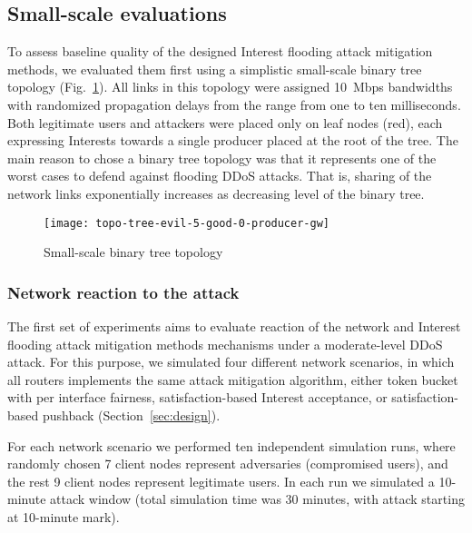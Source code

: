 \subsection{Small-scale evaluations}
\label{sec:small-scale}

To assess baseline quality of the designed Interest flooding attack mitigation methods, we evaluated them first using a simplistic small-scale binary tree topology (Fig.~\ref{fig:small-scale}).
All links in this topology were assigned 10~Mbps bandwidths with randomized propagation delays from the range from one to ten milliseconds.
Both legitimate users and attackers were placed only on leaf nodes (red), each expressing Interests towards a single producer placed at the root of the tree. 
The main reason to chose a binary tree topology was that it represents one of the worst cases to defend against flooding DDoS attacks.
That is, sharing of the network links exponentially increases as decreasing level of the binary tree.

\begin{figure}[htbp]
  \centering
  \texttt{[image: topo-tree-evil-5-good-0-producer-gw]}
  \caption{Small-scale binary tree topology}
  \label{fig:small-scale}
\end{figure}


\subsubsection{Network reaction to the attack}

The first set of experiments aims to evaluate reaction of the network and Interest flooding attack mitigation methods mechanisms under a moderate-level DDoS attack.
For this purpose, we simulated four different network scenarios, in which all routers implements the same attack mitigation algorithm, either token bucket with per interface fairness, satisfaction-based Interest acceptance, or satisfaction-based pushback (Section~\ref{sec:design}).

For each network scenario we performed ten independent simulation runs, where randomly chosen 7 client nodes represent adversaries (compromised users), and the rest 9 client nodes represent legitimate users.
In each run we simulated a 10-minute attack window (total simulation time was 30 minutes, with attack starting at 10-minute mark).

